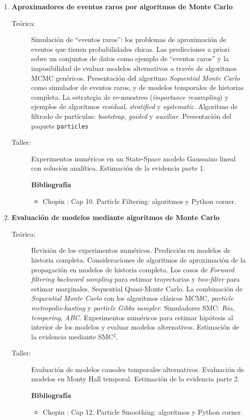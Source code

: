 \documentclass[11pt]{article}
\begin{document}
\begin{enumerate}
\item \textbf{Aproximadores de eventos raros por algoritmos de Monte Carlo}
\vspace{-0.15cm}
\begin{description}
\item[Teórica:] Simulación de ``eventos raros'': los problemas de aproximación de eventos que tienen probabilidades chicas.
Las predicciones a priori sobre un conjuntos de datos como ejemplo de ``eventos raros'' y la imposibilidad de evaluar modelos alternativos a través de algoritmos MCMC genéricos.
Presentación del algoritmo \emph{Sequential Monte Carlo} como simulador de eventos raros, y de modelos temporales de historias completa.
La estrategia de re-muestreo (\emph{importance resampling}) y ejemplos de algoritmos \emph{residual}, \emph{stratified} y \emph{systematic}.
Algoritmo de filtrado de partículas: \emph{bootstrap}, \emph{guided} y \emph{auxiliar}.
Presentación del paquete \texttt{particles}
\item[Taller:] Experimentos numéricos en un State-Space modelo Gaussaino lineal con solución analítica. Estimación de la evidencia parte 1.
\item[] \textbf{Bibliografía}
\begin{itemize}
\item Chopin \cite{chopin2020}: Cap 10. Particle Filtering: algoritmos y Python corner.
\end{itemize}
\end{description}


\item \textbf{Evaluación de modelos mediante algoritmos de Monte Carlo}
\vspace{-0.15cm}
\begin{description}
\item[Teórica:] Revisión de los experimentos numéricos.
Predicción en modelos de historia completa.
Consideraciones de algoritmos de aproximación de la propagación en modelos de historia completa.
Los casos de \emph{Forward filtering backward sampling} para estimar trayectorias y \emph{two-filter} para estimar marginales. Sequential Quasi-Monte Carlo. La combinación de \emph{Sequential Monte Carlo} con los algoritmos clásicos MCMC, \emph{particle metropolis-hasting} y \emph{particle Gibbs sampler}.
Simuladores SMC: \emph{Ibis}, \emph{tempering}, \emph{ABC}.
Experimentos numéricos para estimar hipótesis al interior de los modelos y evaluar modelos alternativos.
Estimación de la evidencia mediante SMC$^2$.
\item[Taller:] Evaluación de modelos causales temporales alternativos. Evaluación de modelos en Monty Hall temporal.  Estimación de la evidencia parte 2.
\item[] \textbf{Bibliografía}
\begin{itemize}
\item Chopin \cite{chopin2020}: Cap 12. Particle Smoothing: algoritmos y Python corner.
\end{itemize}
\end{description}



\end{enumerate}
\end{document}
